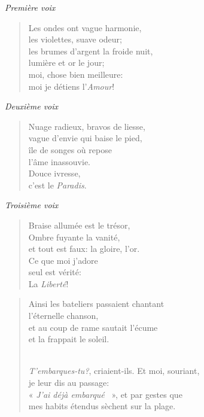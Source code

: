 \documentclass[a4paper,12pt]{book}
\begin{document}
\begin{center} {\em Première voix} \end{center}

\begin{verse}
Les ondes ont vague harmonie, \\
les violettes, suave odeur; \\
les brumes d'argent la froide nuit, \\
lumière et or le jour; \\
moi, chose bien meilleure: \\
moi je détiens l'{\em Amour\/}!
\end{verse}

\smallskip

\begin{center} {\em Deuxième voix} \end{center}

\begin{verse}
Nuage radieux, bravos de liesse, \\
vague d'envie qui baise le pied, \\
île de songes où repose \\
l'âme inassouvie. \\
Douce ivresse, \\
c'est le {\em Paradis}.
\end{verse}


\begin{center} {\em Troisième voix} \end{center}

\begin{verse}
Braise allumée est le trésor, \\
Ombre fuyante la vanité, \\
et tout est faux: la gloire, l'or. \\
Ce que moi j'adore \\
seul est vérité: \\
La {\em Liberté\/}!
\end{verse}

\bigskip

\begin{verse}
Ainsi les bateliers passaient chantant \\
l'éternelle chanson, \\
et au coup de rame sautait l'écume \\
et la frappait le soleil. \\ \

{\em T'embarques-tu?}, criaient-ils. Et moi, souriant, \\
je leur dis au passage: \\
« {\em J'ai déjà embarqué} ~», et par gestes que \\
mes habits étendus sèchent sur la plage. \\
\end{verse}
\end{document}

